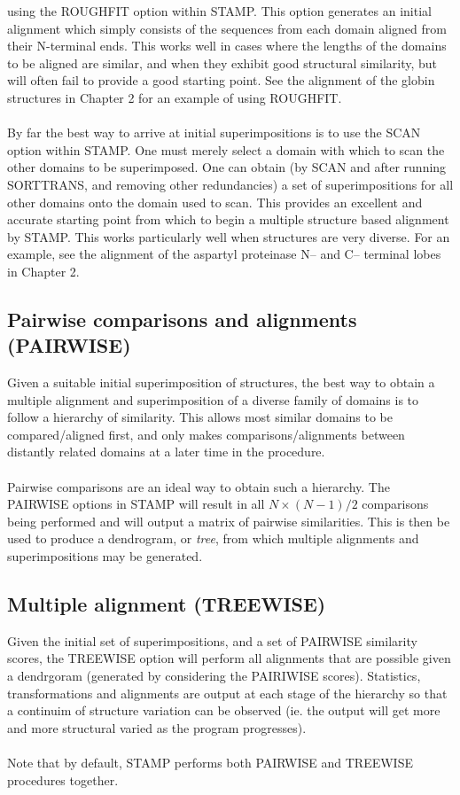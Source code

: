 using the ROUGHFIT option within STAMP.  This option generates an initial 
alignment which simply consists of the sequences from 
each domain aligned from their N-terminal ends.  This works well in
cases where the lengths of the domains to be aligned are similar,
and when they exhibit good structural similarity, but will often
fail to provide a good starting point.  See the alignment of the
globin structures in Chapter 2 for an example of using ROUGHFIT.\\
\\
By far the best way to arrive at initial superimpositions is to use
the SCAN option within STAMP.  One must merely select a domain with
which to scan the other domains to be superimposed.  
One can obtain (by SCAN and after running SORTTRANS, and 
removing other redundancies) a set of
superimpositions for all other domains onto the domain used to scan.  
This provides an excellent and accurate starting point from which to
begin a multiple structure based alignment by STAMP.  This works
particularly well when structures are very diverse.  For an
example, see the alignment of the aspartyl proteinase N-- and C--
terminal lobes in Chapter 2.

\subsection{Pairwise comparisons and alignments (PAIRWISE)}

Given a suitable initial superimposition of structures, 
the best way to obtain a multiple alignment and 
superimposition of a diverse family of domains is to follow a 
hierarchy of similarity.  This allows most similar domains to be 
compared/aligned first, and only makes comparisons/alignments
between distantly related domains at a later time in the procedure.\\
\\
Pairwise comparisons are an ideal way to obtain such a hierarchy. 
The PAIRWISE options in STAMP will result in all $N \times (N-1)/2$
comparisons being performed and will output a matrix of pairwise
similarities.  This is then be used to produce a
dendrogram, or {\em tree}, from which multiple alignments and
superimpositions may be generated.

\subsection{Multiple alignment (TREEWISE)}


Given the initial set of superimpositions, and a set of
PAIRWISE similarity scores, the TREEWISE option will
perform all alignments that are possible given a dendrgoram (generated 
by considering the PAIRIWISE scores). 
Statistics, transformations and alignments are output at each stage
of the hierarchy so that a continuim of structure variation can be
observed (ie. the output will get more and more structural varied
as the program progresses).\\
\\
Note that by default, STAMP performs both PAIRWISE and TREEWISE procedures together.

